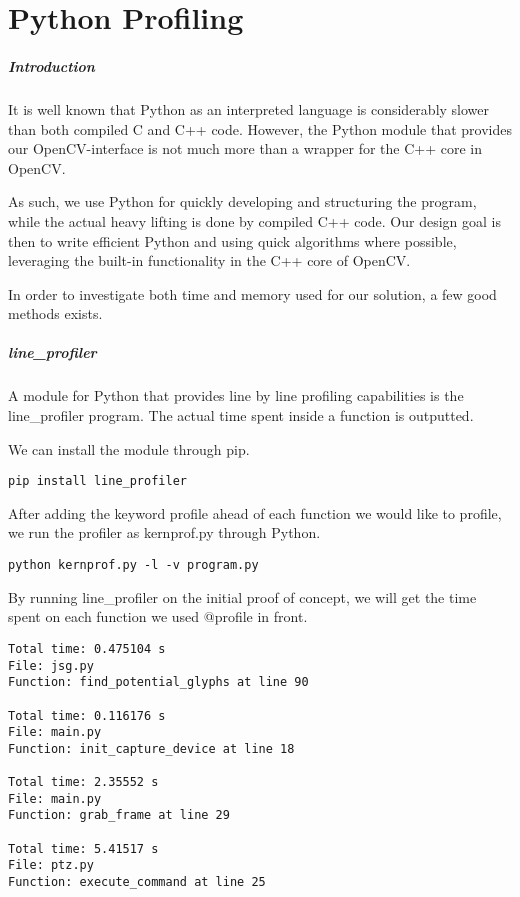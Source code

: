 \chapter{Python Profiling}
\paragraph{Introduction}
It is well known that Python as an interpreted language is considerably slower than both compiled C and C++ code. However, the Python module that provides our OpenCV-interface is not much more than a wrapper for the C++ core in OpenCV.

As such, we use Python for quickly developing and structuring the program, while the actual heavy lifting is done by compiled C++ code. Our design goal is then to write efficient Python and using quick algorithms where possible, leveraging the built-in functionality in the C++ core of OpenCV.

In order to investigate both time and memory used for our solution, a few good methods exists.

\paragraph{line\_profiler}
A module for Python that provides line by line profiling capabilities is the line\_profiler program. The actual time spent inside a function is outputted.

We can install the module through pip.

\begin{lstlisting}[style=BashInputStyle]
    pip install line_profiler
\end{lstlisting}

After adding the keyword profile ahead of each function we would like to profile, we run the profiler as kernprof.py through Python.

\begin{lstlisting}[style=BashInputStyle]
    python kernprof.py -l -v program.py
\end{lstlisting}

By running line\_profiler on the initial proof of concept, we will get the time spent on each function we used @profile in front.

\begin{lstlisting}[style=BashInputStyle]
Total time: 0.475104 s
File: jsg.py
Function: find_potential_glyphs at line 90

Total time: 0.116176 s
File: main.py
Function: init_capture_device at line 18

Total time: 2.35552 s
File: main.py
Function: grab_frame at line 29

Total time: 5.41517 s
File: ptz.py
Function: execute_command at line 25
\end{lstlisting}

